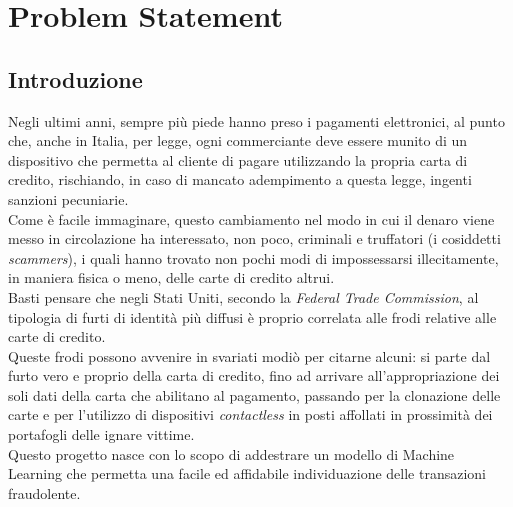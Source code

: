 \documentclass[12pt, a4paper, oneside]{book}
\begin{document}
\chapter*{Problem Statement}
    \section*{Introduzione}
        Negli ultimi anni, sempre più piede hanno preso i pagamenti elettronici, al punto che, anche in Italia, per legge, ogni commerciante deve essere munito di un dispositivo che permetta al cliente di pagare utilizzando la propria carta di credito, rischiando, in caso di mancato adempimento a questa legge, ingenti sanzioni pecuniarie.\\
        
        Come è facile immaginare, questo cambiamento nel modo in cui il denaro viene messo in circolazione ha interessato, non poco, criminali e truffatori (i cosiddetti \textit{scammers}), i quali hanno trovato non pochi modi di impossessarsi illecitamente, in maniera fisica o meno, delle carte di credito altrui.\\
    
        Basti pensare che negli Stati Uniti, secondo la \textit{Federal Trade Commission}, al tipologia di furti di identità più diffusi è proprio correlata alle frodi relative alle carte di credito.\\
        Queste frodi possono avvenire in svariati modiò per citarne alcuni: si parte dal furto vero e proprio della carta di credito, fino ad arrivare all'appropriazione dei soli dati della carta che abilitano al pagamento, passando per la clonazione delle carte e per l'utilizzo di dispositivi \textit{contactless} in posti affollati in prossimità dei portafogli delle ignare vittime.\\
    
        Questo progetto nasce con lo scopo di addestrare un modello di Machine Learning che permetta una facile ed affidabile individuazione delle transazioni fraudolente.

                
\end{document}
